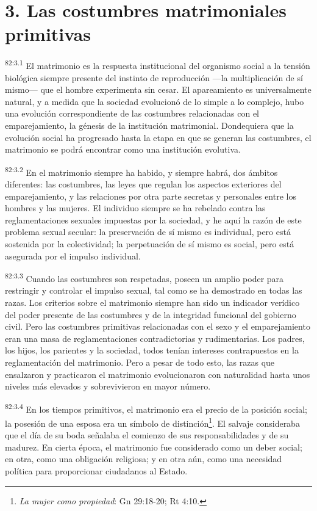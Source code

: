 \section*{3. Las costumbres matrimoniales primitivas}
\par
\textsuperscript{82:3.1} El matrimonio es la respuesta institucional del organismo social a la tensión biológica siempre presente del instinto de reproducción ---la multiplicación de sí mismo--- que el hombre experimenta sin cesar. El apareamiento es universalmente natural, y a medida que la sociedad evolucionó de lo simple a lo complejo, hubo una evolución correspondiente de las costumbres relacionadas con el emparejamiento, la génesis de la institución matrimonial. Dondequiera que la evolución social ha progresado hasta la etapa en que se generan las costumbres, el matrimonio se podrá encontrar como una institución evolutiva.

\par
\textsuperscript{82:3.2} En el matrimonio siempre ha habido, y siempre habrá, dos ámbitos diferentes: las costumbres, las leyes que regulan los aspectos exteriores del emparejamiento, y las relaciones por otra parte secretas y personales entre los hombres y las mujeres. El individuo siempre se ha rebelado contra las reglamentaciones sexuales impuestas por la sociedad, y he aquí la razón de este problema sexual secular: la preservación de sí mismo es individual, pero está sostenida por la colectividad; la perpetuación de sí mismo es social, pero está asegurada por el impulso individual.

\par
\textsuperscript{82:3.3} Cuando las costumbres son respetadas, poseen un amplio poder para restringir y controlar el impulso sexual, tal como se ha demostrado en todas las razas. Los criterios sobre el matrimonio siempre han sido un indicador verídico del poder presente de las costumbres y de la integridad funcional del gobierno civil. Pero las costumbres primitivas relacionadas con el sexo y el emparejamiento eran una masa de reglamentaciones contradictorias y rudimentarias. Los padres, los hijos, los parientes y la sociedad, todos tenían intereses contrapuestos en la reglamentación del matrimonio. Pero a pesar de todo esto, las razas que ensalzaron y practicaron el matrimonio evolucionaron con naturalidad hasta unos niveles más elevados y sobrevivieron en mayor número.

\par
\textsuperscript{82:3.4} En los tiempos primitivos, el matrimonio era el precio de la posición social; la posesión de una esposa era un símbolo de distinción\footnote{\textit{La mujer como propiedad}: Gn 29:18-20; Rt 4:10.}. El salvaje consideraba que el día de su boda señalaba el comienzo de sus responsabilidades y de su madurez. En cierta época, el matrimonio fue considerado como un deber social; en otra, como una obligación religiosa; y en otra aún, como una necesidad política para proporcionar ciudadanos al Estado.

